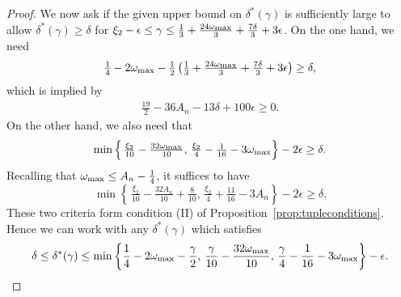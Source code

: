 \documentclass{amsart}
\numberwithin{equation}{section}
\begin{document}
\begin{proof}
We now  ask if the given upper bound on $\delta^*(\gamma)$ is sufficiently large to allow $\delta^*(\gamma) \geq \delta$ for $\xi_2 -\epsilon \leq \gamma \leq  \tfrac{1}{3}+\tfrac{24\omega_{\begin{scriptsize}
\mbox{max}\end{scriptsize}}}{3} +\tfrac{7\delta}{3}  +3\epsilon$. On the one hand, we need
\begin{align*}
\tfrac{1}{4}-2\omega_{\begin{scriptsize}
\mbox{max}\end{scriptsize}} -\tfrac{1}{2} \left( \tfrac{1}{3}+\tfrac{24\omega_{\begin{scriptsize}
\mbox{max}\end{scriptsize}}}{3} +\tfrac{7\delta}{3}  +3\epsilon\right)  \geq \delta,
\end{align*}
which is implied by  
\begin{align*}
\tfrac{19}{2}-36 A_n   - 13\delta   +100\epsilon  \geq 0.
\end{align*}
 On the other hand, we also need that 
 $$  \min\left\{  \, \tfrac{\xi_2}{10} -\tfrac{32\omega_{\begin{scriptsize}
\mbox{max}\end{scriptsize}}}{10}  , \,
\tfrac{\xi_2}{4} -\tfrac{1}{16} -3\omega_{\begin{scriptsize}
\mbox{max}\end{scriptsize}} \right\} -2\epsilon \geq \delta.$$ Recalling that $\omega_{\begin{scriptsize}
\mbox{max}\end{scriptsize}} \leq A_n -\frac{1}{4}$, it suffices to have 
 $$  \min\left\{  \, \tfrac{\xi_2}{10} -\tfrac{32A_n}{10} + \tfrac{8}{10}  , \,
\tfrac{\xi_2}{4} +\tfrac{11}{16} -3A_n  \right\} -2\epsilon \geq \delta.$$
 These two criteria form condition (II) of Proposition~\ref{prop:tupleconditions}.  Hence we can work with any $\delta^*(\gamma)$ which satisfies
 \begin{align*}
\delta \leq \delta^*(\gamma) \leq  \min\left\{\frac{1}{4}-2\omega_{\begin{scriptsize}
\mbox{max}\end{scriptsize}} -\frac{\gamma}{2} , \, \frac{\gamma}{10} -\frac{32\omega_{\begin{scriptsize}
\mbox{max}\end{scriptsize}}}{10}  , \,
\frac{\gamma}{4} -\frac{1}{16} -3\omega_{\begin{scriptsize}
\mbox{max}\end{scriptsize}} \right\} -\epsilon.
\end{align*}  
 

\end{proof}
\end{document}
